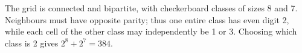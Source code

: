 The grid is connected and bipartite, with checkerboard classes of sizes 8 and 7. Neighbours must have opposite parity; thus one entire class has even digit 2, while each cell of the other class may independently be 1 or 3. Choosing which class is 2 gives $2^8+2^7=\boxed{384}$.
